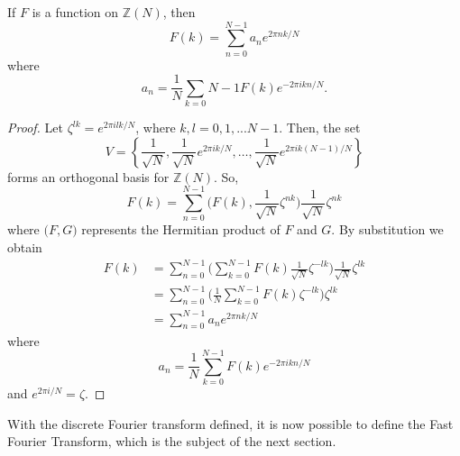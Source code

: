\documentclass[../article.tex]{subfiles}
\begin{document}
\begin{theorem}
If $F$ is a function on $\mathbb{Z}(N)$, then
\[
F(k) = \sum_{n=0}^{N-1} a_n e^{2 \pi nk/N}
\]
where
\[
a_n = \frac{1}{N} \sum_{k=0}{N-1} F(k) e^{-2 \pi ikn/N}.
\]
\end{theorem}
\begin{proof}
Let $\zeta^{lk} = e^{2 \pi i lk/N}$, where $k,l = 0,1,...N-1$. Then, the set
\[
V = \left\{ \frac{1}{\sqrt{N}}, \frac{1}{\sqrt{N}}e^{2 \pi i k/N}, \ldots, \frac{1}{\sqrt{N}}e^{2 \pi i k(N-1)/N} \right\}
\]
forms an orthogonal basis for $\mathbb{Z}(N)$. So,
\[
F(k) = \sum_{n=0}^{N-1} \Big(F(k), \frac{1}{\sqrt{N}}\zeta^{nk} \Big) \frac{1}{\sqrt{N}}\zeta^{nk}
\]
where $\big(F,G \big)$ represents the Hermitian product of $F$ and $G$. By substitution we obtain
\begin{align*}
F(k) &= \sum_{n=0}^{N-1} \Bigg(\sum_{k=0}^{N-1} F(k) \frac{1}{\sqrt{N}} \zeta^{-lk} \Bigg) \frac{1}{\sqrt{N}} \zeta^{lk} \\
&= \sum_{n=0}^{N-1} \Bigg(\frac{1}{N} \sum_{k=0}^{N-1} F(k) \zeta^{-lk} \Bigg) \zeta^{lk} \\
&= \sum_{n=0}^{N-1} a_n e^{2 \pi nk/N}
\end{align*}
where
\[
a_n = \frac{1}{N} \sum_{k=0}^{N-1} F(k) e^{-2 \pi ikn/N}
\]
and $e^{2 \pi i/N} = \zeta$.
\end{proof}

With the discrete Fourier transform defined, it is now possible to define the Fast Fourier Transform, which is the subject of the next section.
\end{document}
